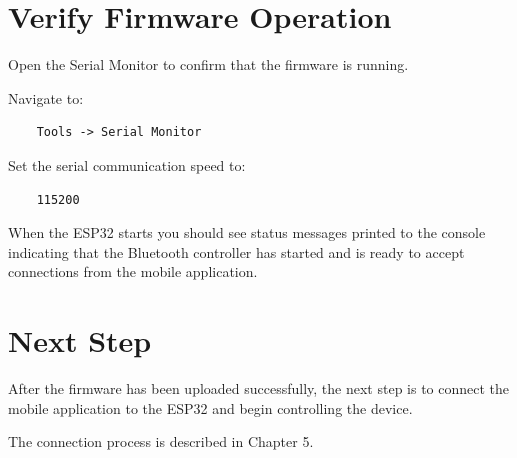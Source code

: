 \section{Verify Firmware Operation}

Open the Serial Monitor to confirm that the firmware is running.

Navigate to:

\begin{verbatim}
	Tools -> Serial Monitor
\end{verbatim}

Set the serial communication speed to:

\begin{verbatim}
	115200
\end{verbatim}

When the ESP32 starts you should see status messages printed to the console indicating that the Bluetooth controller has started and is ready to accept connections from the mobile application.

\section{Next Step}

After the firmware has been uploaded successfully, the next step is to connect the mobile application to the ESP32 and begin controlling the device.

The connection process is described in Chapter 5.
